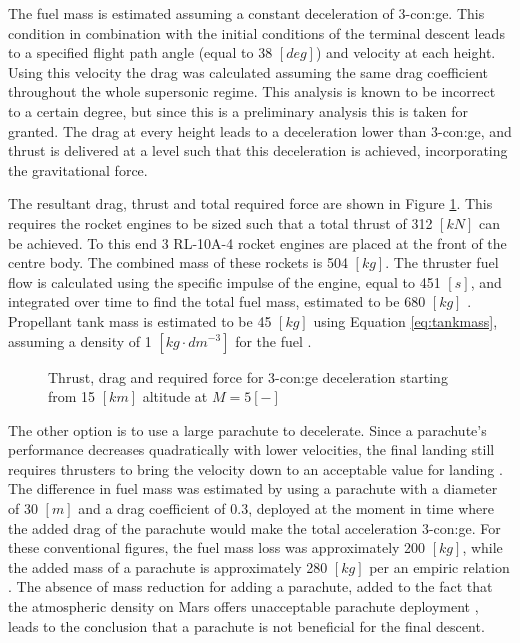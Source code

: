 The fuel mass is estimated assuming a constant deceleration of 3-\gls{con:ge}. This condition in combination with the initial conditions of the terminal descent leads to a specified flight path angle (equal to 38 $[deg]$) and velocity at each height. Using this velocity the drag was calculated assuming the same drag coefficient throughout the whole supersonic regime. This analysis is known to be incorrect to a certain degree, but since this is a preliminary analysis this is taken for granted. The drag at every height leads to a deceleration lower than 3-\gls{con:ge}, and thrust is delivered at a level such that this deceleration is achieved, incorporating the gravitational force. 

The resultant drag, thrust and total required force are shown in Figure \ref{fig:TDforce}. This requires the rocket engines to be sized such that a total thrust of 312 $[kN]$ can be achieved. To this end 3 RL-10A-4 rocket engines are placed at the front of the centre body. The combined mass of these rockets is 504 $[kg]$. The thruster fuel flow is calculated using the specific impulse of the engine, equal to 451 $[s]$, and integrated over time to find the total fuel mass, estimated to be 680 $[kg]$ \cite[p.538]{Wertz2011}. Propellant tank mass is estimated to be 45 $[kg]$ using Equation \ref{eq:tankmass}, assuming a density of 1 $[kg\cdot dm^{-3}]$ for the fuel \cite[p.543]{Wertz2011}.

\begin{figure}[h]
	\centering
	\setlength{} 
	\setlength{}
	
	\caption{Thrust, drag and required force for 3-\gls{con:ge} deceleration starting from 15 $[km]$ altitude at $M=5 \left[-\right]$}
	\label{fig:TDforce}
\end{figure}


The other option is to use a large parachute to decelerate. Since a parachute's performance decreases quadratically with lower velocities, the final landing still requires thrusters to bring the velocity down to an acceptable value for landing \cite{Braun2007}. The difference in fuel mass was estimated by using a parachute with a diameter of 30 $[m]$ and a drag coefficient of 0.3, deployed at the moment in time where the added drag of the parachute would make the total acceleration 3-\gls{con:ge}. For these conventional figures, the fuel mass loss was approximately 200 $[kg]$, while the added mass of a parachute is approximately 280 $[kg]$ per an empiric relation \cite{Anderson1969}. The absence of mass reduction for adding a parachute, added to the fact that the atmospheric density on Mars offers unacceptable parachute deployment \cite{Korzun2009}, leads to the conclusion that a parachute is not beneficial for the final descent.

